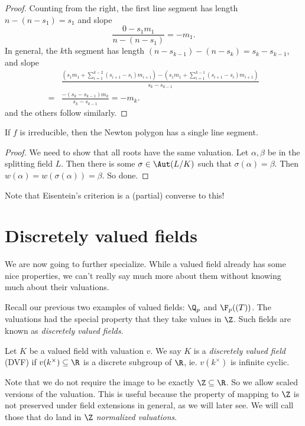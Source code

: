 \documentclass[a4paper]{article}
\begin{document}
\begin{proof}
  Counting from the right, the first line segment has length $n - (n - s_1) = s_1$ and slope
  \[
    \frac{0 - s_1 m_1}{n - (n - s_1)} = -m_1.
  \]
  In general, the $k$th segment has length $(n - s_{k - 1}) - (n - s_k) = s_k - s_{k - 1}$, and slope
  \begin{align*}
    &\frac{\left(s_1 m_1 + \sum_{i = 1}^{k - 2} (s_{i + 1} - s_i) m_{i + 1}\right) - \left(s_1 m_1 + \sum_{i = 1}^{k - 1} (s_{i + 1} - s_i) m_{i + 1}\right)}{s_k - s_{k - 1}} \\
    ={}& \frac{-(s_k - s_{k - 1})m_k}{s_k - s_{k - 1}} = - m_k.
  \end{align*}
  and the others follow similarly.
\end{proof}

\begin{cor}
  If $f$ is irreducible, then the Newton polygon has a single line segment.
\end{cor}

\begin{proof}
  We need to show that all roots have the same valuation. Let $\alpha, \beta$ be in the splitting field $L$. Then there is some $\sigma \in \Aut(L/K)$ such that $\sigma(\alpha) = \beta$. Then $w(\alpha) = w(\sigma(\alpha)) = \beta$. So done.
\end{proof}

Note that Eisentein's criterion is a (partial) converse to this!

\section{Discretely valued fields}
We are now going to further specialize. While a valued field already has some nice properties, we can't really say much more about them without knowing much about their valuations.

Recall our previous two examples of valued fields: $\Q_p$ and $\F_p((T))$. The valuations had the special property that they take values in $\Z$. Such fields are known as \emph{discretely valued fields}.

\begin{defi}
  Let $K$ be a valued field with valuation $v$. We say $K$ is a \emph{discretely valued field} (DVF) if $v(k^\times) \subseteq \R$ is a discrete subgroup of $\R$, ie. $v(k^\times)$ is infinite cyclic.
\end{defi}
Note that we do not require the image to be exactly $\Z \subseteq \R$. So we allow scaled versions of the valuation. This is useful because the property of mapping to $\Z$ is not preserved under field extensions in general, as we will later see. We will call those that do land in $\Z$ \emph{normalized valuations}.
\end{document}
